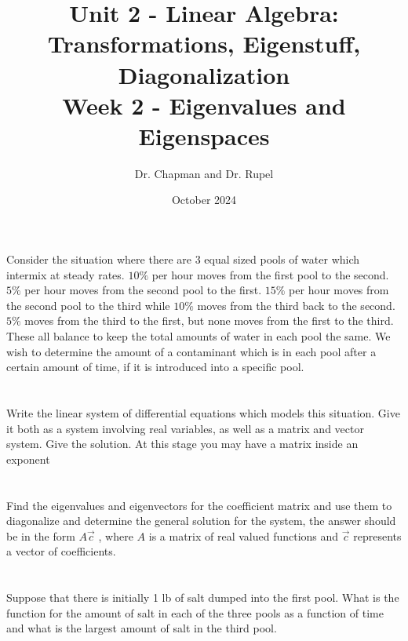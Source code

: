 \documentclass{article}
\title{Unit 2 - Linear Algebra: Transformations, Eigenstuff, Diagonalization \\ Week 2 - Eigenvalues and Eigenspaces}
\author{Dr. Chapman and Dr. Rupel}
\date{October 2024}
\begin{document}
\maketitle
Consider the situation where there are 3 equal sized pools of water which intermix at steady rates. $10\%$ per hour moves from the first pool to the second. $5\%$ per hour moves from the second pool to the first. $15\%$ per hour moves from the second pool to the third while $10\%$ moves from the third back to the second. $5\%$ moves from the third to the first, but none moves from the first to the third. These all balance to keep the total amounts of water in each pool the same. We wish to determine the amount of a contaminant which is in each pool after a certain amount of time, if it is introduced into a specific pool.
\section{}
Write the linear system of differential equations which models this situation. Give it both as a system involving real variables, as well as a matrix and vector system. Give the solution. At this stage you may have a matrix inside an exponent
\section{}
Find the eigenvalues and eigenvectors for the coefficient matrix and use them to diagonalize and determine the general solution for the system, the answer should be in the form $A\vec{c}$ , where $A$ is a matrix of real valued functions and $\vec{c}$ represents a vector of coefficients.
\section{}
Suppose that there is initially 1 lb of salt dumped into the first pool. What is the function for the amount of salt in each of the three pools as a function of time and what is the largest amount of salt in the third pool.
\end{document}
